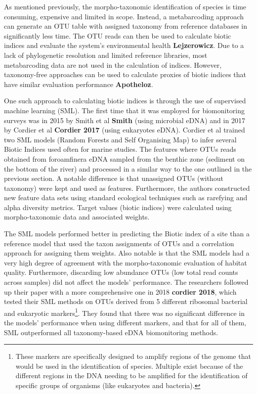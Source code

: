 As mentioned previously, the morpho-taxonomic identification of species is time consuming, expensive and limited in scope. Instead, a metabarcoding approach can generate an OTU table with assigned taxonomy from reference databases in significantly less time. The OTU reads can then be used to calculate biotic indices and evaluate the system's environmental health  \textbf{Lejzerowicz}. Due to a lack of phylogenetic resolution and limited reference libraries, most metabarcoding data are not used in the calculation of indices. However, taxonomy-free approaches can be used to calculate proxies of biotic indices that have similar evaluation performance \textbf{Apotheloz}. 

One such approach to calculating biotic indices is through the use of supervised machine learning (SML). The first time that it was employed for biomonitoring surveys was in 2015 by Smith et al \textbf{Smith} (using microbial eDNA) and in 2017 by Cordier et al \textbf{Cordier 2017} (using eukaryotes eDNA). Cordier et al trained two SML models (Random Forests and Self Organising Map) to infer several Biotic Indices used often for marine studies. The features where OTUs reads obtained from foroamfinera eDNA sampled from the benthic zone (sediment on the bottom of the river) and processed in a similar way to the one outlined in the previous section. A notable difference is that unassigned OTUs (without taxonomy) were kept and used as features. Furthermore, the authors constructed new feature data sets using standard ecological techniques such as rarefying and alpha diversity metrics. Target values (biotic indices) were calculated using morpho-taxonomic data and associated weights. 

The SML models performed better in predicting the Biotic index of a site than a reference model that used the taxon assignments of OTUs and a correlation approach for assigning them weights. Also notable is that the SML models had a very high degree of agreement with the morpho-taxonomic evaluation of habitat quality. Furthermore, discarding low abundance OTUs (low total read counts across samples) did not affect the models' performance. The researchers followed up their paper with a more comprehensive one in 2018 \textbf{cordier 2018}, which tested their SML methods on OTUs derived from 5 different ribosomal bacterial and eukaryotic markers\footnote{These markers are specifically designed to amplify regions of the genome that would be used in the identification of species. Multiple exist because of the different regions in the DNA needing to be amplified for the identification of specific groups of organisms (like eukaryotes and bacteria).}. They found that there was no significant difference in the models' performance when using different markers, and that for all of them, SML outperformed all taxonomy-based eDNA biomonitoring methods. 



